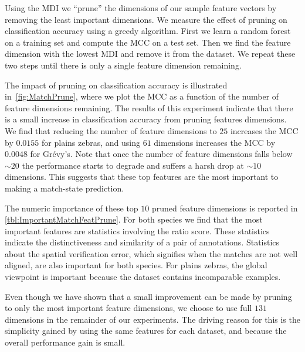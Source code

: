         Using the MDI we ``prune'' the dimensions of our sample feature vectors by removing the least important
          dimensions.
        We measure the effect of pruning on classification accuracy using a greedy algorithm.
        First we learn a random forest on a training set and compute the MCC on a test set.
        Then we find the feature dimension with the lowest MDI and remove it from the dataset.
        We repeat these two steps until there is only a single feature dimension remaining.

        The impact of pruning on classification accuracy is illustrated in~\cref{fig:MatchPrune}, where we plot
          the MCC as a function of the number of feature dimensions remaining.
        The results of this experiment indicate that there is a small increase in classification accuracy from
          pruning features dimensions.
        We find that reducing the number of feature dimensions to $25$ increases the MCC by $0.0155$ for plains
          zebras, and using $61$ dimensions increases the MCC by $0.0048$ for Grévy's.
        Note that once the number of feature dimensions falls below ${\sim}20$ the performance starts to degrade
          and suffers a harsh drop at ${\sim}10$ dimensions.
        This suggests that these top features are the most important to making a match-state prediction.

        The numeric importance of these top $10$ pruned feature dimensions is reported in
          \cref{tbl:ImportantMatchFeatPrune}.
        For both species we find that the most important features are statistics involving the ratio score.
        These statistics indicate the distinctiveness and similarity of a pair of annotations.
        Statistics about the spatial verification error, which signifies when the matches are not well aligned,
          are also important for both species.
        For plains zebras, the global viewpoint is important because the dataset contains incomparable examples.

        Even though we have shown that a small improvement can be made by pruning to only the most important
          feature dimensions, we choose to use full $131$ dimensions in the remainder of our experiments.
        The driving reason for this is the simplicity gained by using the same features for each dataset, and
          because the overall performance gain is small.

        \MatchPrune{}

        \ImportantMatchFeatPrune{}

